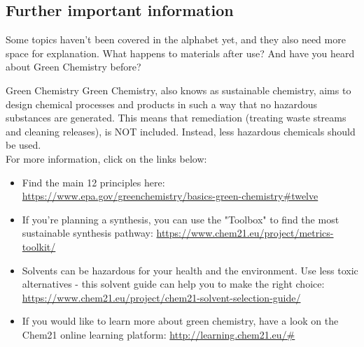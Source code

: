 \subsection{Further important information}
Some topics haven't been covered in the alphabet yet, and they also need more space for explanation. What happens to materials after use? And have you heard about Green Chemistry before?

\begin{suggest}{Green Chemistry}
	Green Chemistry, also knows as sustainable chemistry, aims to design chemical processes and products in such a way that no hazardous substances are generated. This means that remediation (treating waste streams and cleaning releases), is NOT included. Instead, less hazardous chemicals should be used.\\
	For more information, click on the links below:
	\begin{itemize}
		\item Find the main 12 principles here: \\ \url{https://www.epa.gov/greenchemistry/basics-green-chemistry#twelve}
		\item If you're planning a synthesis, you can use the "Toolbox" to find the most sustainable synthesis pathway:  \url{https://www.chem21.eu/project/metrics-toolkit/}
		\item Solvents can be hazardous for your health and the environment. Use less toxic alternatives - this solvent guide can help you to make the right choice: \url{https://www.chem21.eu/project/chem21-solvent-selection-guide/}
		\item If you would like to learn more about green chemistry, have a look on the Chem21 online learning platform: \url{http://learning.chem21.eu/#}
	\end{itemize}
\end{suggest}

